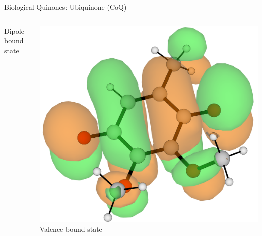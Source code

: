 \documentclass[9pt,t,xcolor=table]{beamer}
\begin{document}
\begin{frame}{\huge Biological Quinones: Ubiquinone (CoQ)}
\begin{columns}[b]
\begin{column}[b]{0.25\textwidth}
				\vspace{10pt}
				\small Dipole-bound state\\
				\footnotesize \vspace{\baselineskip}
			\end{column}
			\begin{column}[b]{0.25\textwidth}
				\centering
				\includegraphics[width=1\textwidth]{Figs/Q0_52_VBS.png}\\
				\vspace{25pt}
				\small Valence-bound state\\
				\footnotesize \vspace{\baselineskip}
			\end{column}
		\end{columns}
\end{frame}
\end{document}
